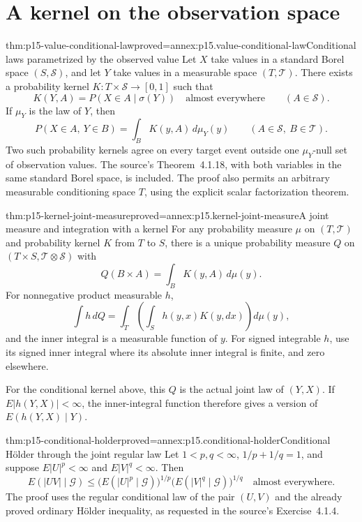 \section{A kernel on the observation space}
\label{sec:p15-observation-kernel}

\begin{hbtheorem}{thm:p15-value-conditional-law}{proved=annex:p15.value-conditional-law}{Conditional laws parametrized by the observed value}
Let \(X\) take values in a standard Borel space \((S,\mathcal S)\),
and let \(Y\) take values in a measurable space \((T,\mathcal T)\).
There exists a probability kernel \(K:T\times\mathcal S\to[0,1]\)
such that
\[
                  K(Y,A)=P(X\in A\mid\sigma(Y))
                               \quad\text{almost everywhere}
                                       \qquad(A\in\mathcal S).
\]
If \(\mu_Y\) is the law of \(Y\), then
\[
               P(X\in A,\ Y\in B)=\int_B K(y,A)\,d\mu_Y(y)
                                  \qquad(A\in\mathcal S,\ B\in\mathcal T).
\]
Two such probability kernels agree on every target event outside one
\(\mu_Y\)-null set of observation values.
The source's Theorem~4.1.18, with both variables in the same standard
Borel space, is included. The proof also permits an arbitrary measurable
conditioning space \(T\), using the explicit scalar factorization theorem.
\end{hbtheorem}

\begin{hbtheorem}{thm:p15-kernel-joint-measure}{proved=annex:p15.kernel-joint-measure}{A joint measure and integration with a kernel}
For any probability measure \(\mu\) on \((T,\mathcal T)\) and
probability kernel \(K\) from \(T\) to \(S\), there is a unique
probability measure \(Q\) on
\((T\times S,\mathcal T\otimes\mathcal S)\) with
\[
                              Q(B\times A)=\int_BK(y,A)\,d\mu(y).
\]
For nonnegative product measurable \(h\),
\[
                \int h\,dQ
                      =\int_T\left(\int_Sh(y,x)K(y,dx)\right)d\mu(y),
\]
and the inner integral is a measurable function of \(y\).
For signed integrable \(h\), use its signed inner integral where its
absolute inner integral is finite, and zero elsewhere.

For the conditional kernel above, this \(Q\) is the actual joint law
of \((Y,X)\). If \(E|h(Y,X)|<\infty\), the inner-integral function
therefore gives a version of \(E(h(Y,X)\mid Y)\).
\end{hbtheorem}

\begin{hbtheorem}{thm:p15-conditional-holder}{proved=annex:p15.conditional-holder}{Conditional H\"older through the joint regular law}
Let \(1<p,q<\infty\), \(1/p+1/q=1\), and suppose
\(E|U|^p<\infty\) and \(E|V|^q<\infty\).
Then
\[
 E(|UV|\mid\mathcal G)
    \leq \bigl(E(|U|^p\mid\mathcal G)\bigr)^{1/p}
          \bigl(E(|V|^q\mid\mathcal G)\bigr)^{1/q}
                      \quad\text{almost everywhere}.
\]
The proof uses the regular conditional law of the pair \((U,V)\)
and the already proved ordinary H\"older inequality, as requested in
the source's Exercise~4.1.4.
\end{hbtheorem}

